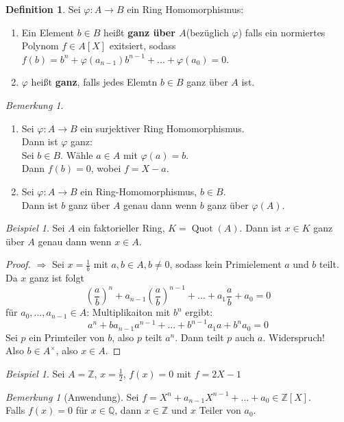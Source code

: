 \documentclass[10pt,a4paper]{article}
\newcommand{\Z}{\ensuremath{\mathbb{Z}}}
\newcommand{\Q}{\ensuremath{\mathbb{Q}}}
\newcommand{\Quot}{\operatorname{Quot}}
\newcounter{thm}[section]
\theoremstyle{definition}
\newtheorem{definition}[thm]{Definition}
\theoremstyle{plain}
\theoremstyle{remark}
\newtheorem{bem}[thm]{Bemerkung}
\newtheorem*{bem*}{Bemerkung}
\newtheorem{exm}[thm]{Beispiel}
\newtheorem*{exm*}{Beispiel}
\begin{document}
\begin{definition}
	Sei $\varphi:A\rightarrow B$ ein Ring Homomorphismus:
	\begin{enumerate}
		\item Ein Element $b\in B$ heißt \textbf{ganz über $A$}(bezüglich $\varphi$) falls ein normiertes Polynom $f\in A[X]$ exitsiert, sodass $f(b)=b^n+\varphi(a_{n-1})b^{n-1}+...+\varphi(a_0)=0$.
		\item $\varphi$ heißt \textbf{ganz}, falls jedes Elemtn $b\in B$ ganz über $A$ ist.
	\end{enumerate}
\end{definition}
\begin{bem}
	\begin{enumerate}
		\item Sei $\varphi:A\rightarrow B$ ein surjektiver Ring Homomorphismus.\\
		Dann ist $\varphi$ ganz:\\
		Sei $b\in B$. Wähle $a\in A$ mit $\varphi(a)=b$.\\
		Dann $f(b)=0$, wobei $f=X-a$.
		\item Sei $\varphi:A\rightarrow B$ ein Ring-Homomorphismus, $b\in B$.\\
		Dann ist $b$ ganz über $A$ genau dann wenn $b$ ganz über $\varphi(A)$.
	\end{enumerate}
\end{bem}
\begin{exm}\label{603Exm}
	Sei $A$ ein faktorieller Ring, $K=\Quot(A)$. Dann ist $x\in K$ ganz über $A$ genau dann wenn $x\in A$.
\end{exm}
\begin{proof}
	$\Rightarrow$ Sei $x=\frac{1}{b}$ mit $a,b\in A, b\neq 0$, sodass kein Primielement $a$ und $b$ teilt.\\
	Da $x$ ganz ist folgt
	\[\left(\frac{a}{b}\right)^n+a_{n-1}\left(\frac{a}{b}\right)^{n-1}+...+a_1\frac{a}{b}+a_0=0\]
	für $a_0,...,a_{n-1}\in A$:
	Multiplikaiton mit $b^n$ ergibt:
	\[a^n+ba_{n-1}a^{n-1}+...+b^{n-1} a_1a+b^na_0=0\]
	Sei $p$ ein Primteiler von $b$, also $p$ teilt $a^n$. Dann teilt $p$ auch $a$. Widerspruch!\\
	Also $b\in A^\times$, also $x\in A$.
\end{proof}


\begin{exm*}
	Sei $A=\Z$, $x=\frac{1}{2}$, $f(x)=0$ mit $f=2X-1$
\end{exm*}
\begin{bem*}[Anwendung]
	Sei $f=X^n+a_{n-1}X^{n-1}+...+a_0\in \Z[X]$.\\
	Falls $f(x)=0$ für $x\in\Q$, dann $x\in\Z$ und $x$ Teiler von $a_0$.
\end{bem*}
\end{document}
